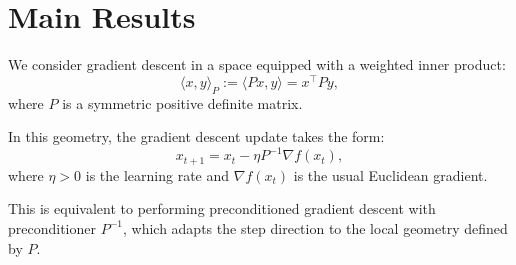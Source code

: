 \documentclass{article}
\begin{document}



\section*{Main Results}

We consider gradient descent in a space equipped with a weighted inner product:
\[
\langle x, y \rangle_P := \langle P x, y \rangle = x^\top P y,
\]
where \(P\) is a symmetric positive definite matrix.

In this geometry, the gradient descent update takes the form:
\[
x_{t+1} = x_t - \eta P^{-1} \nabla f(x_t),
\]
where \(\eta > 0\) is the learning rate and \(\nabla f(x_t)\) is the usual Euclidean gradient.

This is equivalent to performing preconditioned gradient descent with preconditioner \(P^{-1}\), which adapts the step direction to the local geometry defined by \(P\).
\end{document}
